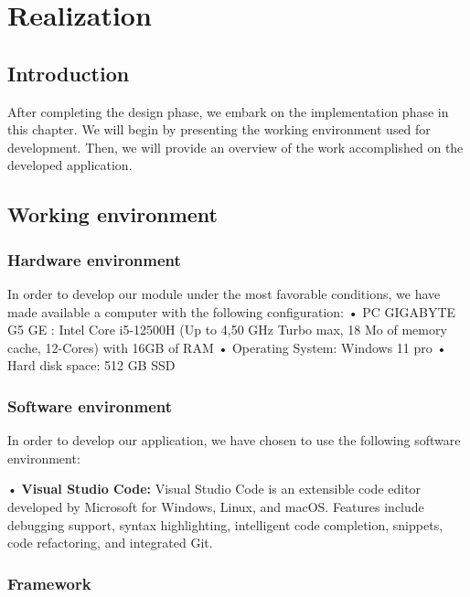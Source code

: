 \chapter{Realization }

\section{Introduction}

After completing the design phase, we embark on the implementation phase in this chapter. We will begin by presenting the working environment used for development. Then, we will provide an overview of the work accomplished on the developed application. 

\section{Working environment }

\subsection{Hardware environment }

In order to develop our module under the most favorable conditions, we have made available a computer with the following configuration: 
• PC GIGABYTE G5 GE : Intel Core i5-12500H (Up to 4,50 GHz Turbo max, 18 Mo of memory cache, 12-Cores)  with 16GB of RAM
• Operating System: Windows 11 pro 
• Hard disk space: 512 GB SSD

\subsection{Software environment }

In order to develop our application, we have chosen to use the following software environment:

• \textbf{Visual Studio Code:} Visual Studio Code is an extensible code editor developed by Microsoft for Windows, Linux, and macOS. Features include debugging support, syntax highlighting, intelligent code completion, snippets, code refactoring, and integrated Git. 

\subsection{Framework }

